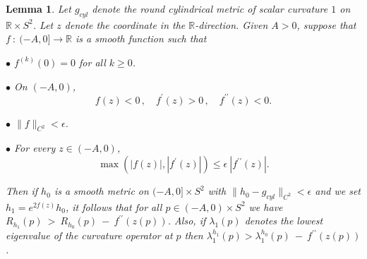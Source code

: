 \documentclass[12pt]{amsart}
\newcommand{\R}{{\mathbb R}}
\newcommand{\eps}{\epsilon}
\newcommand{\la}{\lambda}
\newcommand{\ra}{\rightarrow}
\numberwithin{equation}{section}
\theoremstyle{plain}
\newtheorem{lemma}[equation]{Lemma}
\theoremstyle{definition}
\theoremstyle{remark}
\begin{document}
\begin{lemma}
\label{lemroundoff}
Let $g_{cyl}$ denote the round cylindrical metric  of scalar
curvature $1$ on $\R \times S^2$. Let $z$ denote the coordinate 
in the $\R$-direction.
Given $A>0$, suppose that $f \: : \: (-A,0]\ra \R$ is a 
smooth function such that 

$\bullet$ $f^{(k)}(0)=0$ for all $k\geq 0$.

$\bullet$  On $(-A,0)$, 
\begin{equation}
f(z) <0\,,\quad f^\prime(z) >0\,,\quad f^{\prime \prime}(z)<0.
\end{equation}

$\bullet$ $\|f\|_{C^2}<\eps$.

$\bullet$  For every $z \in (-A,0)$, 
\begin{equation}
\label{eqnderivcomparision}
\max\left(|f(z)|,\left|f^\prime(z) \right|\right)
\leq \eps\:\left| f^{\prime \prime}(z) \right|.
\end{equation}

Then if  $h_0$ is a smooth metric on $(-A,0] \times S^2$
with $\|h_0-g_{cyl}\|_{C^2}<\eps$  and we set
 $h_1= e^{2f(z)}h_0$, it follows that for all $p \in (-A,0) \times S^2$ we have
$R_{h_1}(p) \: > \: R_{h_0}(p) \: - \: f^{\prime\prime}(z(p))$.
Also, if $\la_1(p)$ denotes the lowest eigenvalue of the curvature operator at $p$ then $\la_1^{h_1}(p)>\la_1^{h_0}(p) \: - \: f^{\prime\prime}(z(p))$.
\end{lemma}
\end{document}
